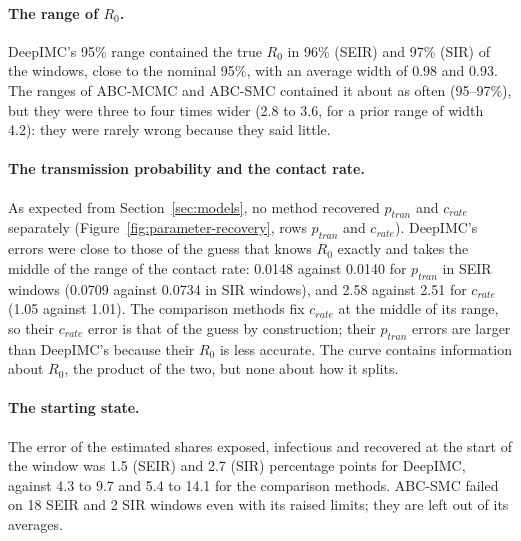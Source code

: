 \documentclass[12pt]{article}
\begin{document}
\paragraph{The range of $R_0$.} DeepIMC's 95\% range contained the true $R_0$ in 96\% (SEIR) and 97\% (SIR) of
the windows, close to the nominal 95\%, with an average width of 0.98 and 0.93. The ranges of ABC-MCMC and
ABC-SMC contained it about as often (95--97\%), but they were three to four times wider (2.8 to 3.6, for a prior
range of width 4.2): they were rarely wrong because they said little.

\paragraph{The transmission probability and the contact rate.} As expected from Section~\ref{sec:models}, no
method recovered $p_{tran}$ and $c_{rate}$ separately (Figure~\ref{fig:parameter-recovery}, rows $p_{tran}$ and
$c_{rate}$). DeepIMC's errors were close to those of the guess that knows $R_0$ exactly and takes the middle of
the range of the contact rate: 0.0148 against 0.0140 for $p_{tran}$ in SEIR windows (0.0709 against 0.0734 in
SIR windows), and 2.58 against 2.51 for $c_{rate}$ (1.05 against 1.01). The comparison methods fix $c_{rate}$ at
the middle of its range, so their $c_{rate}$ error is that of the guess by construction; their $p_{tran}$ errors
are larger than DeepIMC's because their $R_0$ is less accurate. The curve contains information about $R_0$, the
product of the two, but none about how it splits.

\paragraph{The starting state.} The error of the estimated shares exposed, infectious and recovered at the start
of the window was 1.5 (SEIR) and 2.7 (SIR) percentage points for DeepIMC, against 4.3 to 9.7 and 5.4 to 14.1 for
the comparison methods. ABC-SMC failed on 18 SEIR and 2 SIR windows even with its raised limits; they are left
out of its averages.

\begin{table}[htbp]
\centering
\caption{Parameter recovery on the 10,000 simulated test windows (5,000 per model). MAE of $R_0$ for all
windows and for early, middle and late windows; for the methods that give a 95\% range of $R_0$, the
percentage of windows whose range contains the true value and the average width of the range; MAE of
$p_{tran}$ and $c_{rate}$, with the error of a guess that knows $R_0$ exactly and takes the middle of the
range of $c_{rate}$; starting-state error (percentage points). Bold: lowest error. The comparison methods
fix $c_{rate}$ at the middle of its range, so their $c_{rate}$ error is that of the guess. Weighted DeepIMC keeps
DeepIMC's $R_0$ and range; only its starting state differs.}
\label{tab:sim-parameters}
\small
\resizebox{\textwidth}{!}{}
\end{table}
\end{document}
